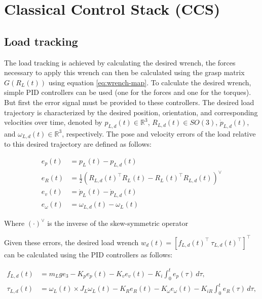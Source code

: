 \section{Classical Control Stack (CCS)}

\subsection{Load tracking}

The load tracking is achieved by calculating the desired wrench, the
forces necessary to apply this wrench can then be calculated using the
grasp matrix $G(R_L(t))$ using equation \eqref{eq:wrench-map}. To
calculate the desired wrench, simple PID controllers can be used (one for
the forces and one for the torques). But first the error signal must be
provided to these controllers. The desired load trajectory is
characterized by the desired position, orientation, and corresponding
velocities over time, denoted by $p_{L,d}(t) \in \mathbb{R}^3$,
$R_{L,d}(t) \in SO(3)$, $\dot{p}_{L,d}(t)$, and $\omega_{L,d}(t) \in
\mathbb{R}^3$, respectively. The pose and velocity errors of the load
relative to this desired trajectory are defined as follows:

\begin{align}
  e_p(t) &= p_L(t) - p_{L,d}(t) \label{eq:error-position} \\
  e_R(t) &= \tfrac{1}{2} \left(R_{L,d}(t)^\top R_L(t) - R_L(t)^\top R_{L,d}(t)\right)^\vee \label{eq:error-orientation} \\
  e_v(t) &= \dot{p}_L(t) - \dot{p}_{L,d}(t) \label{eq:error-velocity} \\
  e_\omega(t) &= \omega_{L,d}(t) - \omega_L(t) \label{eq:error-angular-velocity}
\end{align}

Where $(\cdot)^\vee$ is the inverse of the skew-symmetric operator

Given these errors, the desired load wrench $w_d(t) =
[f_{L,d}(t)^\top\ \tau_{L,d}(t)^\top]^\top$ can be calculated using the
PID controllers as follows:

\begin{align}
  f_{L,d}(t) &= m_L g e_3 - K_p e_p(t) - K_v e_v(t) - K_i \int_0^t e_p(\tau)\, d\tau, \label{eq:desired-force} \\
  \tau_{L,d}(t) &= \omega_L(t) \times J_L \omega_L(t) - K_R e_R(t) - K_\omega e_\omega(t) - K_{iR} \int_0^t e_R(\tau)\, d\tau, \label{eq:desired-torque}
\end{align}


